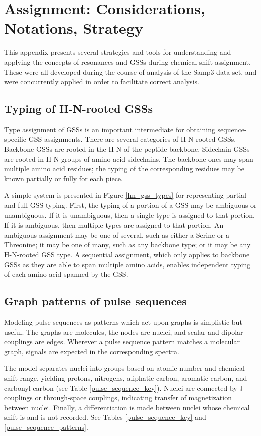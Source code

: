 \chapter{Assignment: Considerations, Notations, Strategy}
This appendix presents several strategies and tools for understanding and 
applying the concepts of resonances and GSSs during chemical shift assignment.
These were all developed during the course of analysis of the Samp3 data set,
and were concurrently applied in order to facilitate correct analysis.


\section{Typing of H-N-rooted GSSs}
Type assignment of GSSs is an important intermediate for obtaining 
sequence-specific GSS assignments.  There are several categories of H-N-rooted
GSSs.  Backbone GSSs are rooted in the H-N of the peptide backbone.  Sidechain 
GSSs are rooted in H-N groups of amino acid sidechains.
The backbone ones may span multiple amino acid residues; the typing of the 
corresponding residues may be known partially or fully for each piece.

A simple system is presented in Figure \ref{hn_gss_types} for representing 
partial and full GSS typing.  First, the typing of a portion of a GSS may be 
ambiguous or unambiguous.  If it is unambiguous, then a single type is assigned
to that portion.  If it is ambiguous, then multiple types are assigned to that
portion.  An ambiguous assignment may be one of several, such as either a
Serine or a Threonine; it may be one of many, such as any backbone type; or
it may be any H-N-rooted GSS type.  A sequential assignment, which only applies
to backbone GSSs as they are able to span multiple amino acids, enables 
independent typing of each amino acid spanned by the GSS.


\section{Graph patterns of pulse sequences}
Modeling pulse sequences as patterns which act upon graphs is simplistic but
useful.  The graphs are molecules, the nodes are nuclei, and scalar and
dipolar couplings are edges.  Wherever a pulse sequence pattern matches 
a molecular graph, signals are expected in the corresponding spectra.

The model separates nuclei into groups based on atomic number
and chemical shift range, yielding protons, nitrogens, aliphatic carbon,
aromatic carbon, and carbonyl carbon (see Table \ref{pulse_sequence_key}).
Nuclei are connected by J-couplings or through-space couplings, 
indicating transfer of magnetization between nuclei.
Finally, a differentiation is made between nuclei whose chemical shift is 
and is not recorded.  See Tables \ref{pulse_sequence_key} and 
\ref{pulse_sequence_patterns}.

